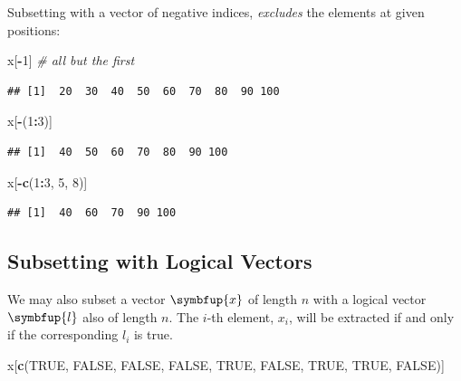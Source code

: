 \documentclass[10pt,b5paper,krantz1]{krantz}
\newenvironment{Shaded}{\begin{snugshade}}{\end{snugshade}}
\newcommand{\CommentTok}[1]{\textcolor[rgb]{0.37,0.37,0.37}{\textit{#1}}}
\newcommand{\DecValTok}[1]{\textcolor[rgb]{0.06,0.06,0.06}{#1}}
\newcommand{\KeywordTok}[1]{\textcolor[rgb]{0.27,0.27,0.27}{\textbf{#1}}}
\newcommand{\NormalTok}[1]{#1}
\newcommand{\OperatorTok}[1]{\textcolor[rgb]{0.43,0.43,0.43}{\textbf{#1}}}
\newcommand{\OtherTok}[1]{\textcolor[rgb]{0.37,0.37,0.37}{#1}}
\renewcommand{\boldsymbol}[1]{\symbfup{#1}}
\begin{document}
Subsetting with a vector of negative indices, \emph{excludes} the elements
at given positions:

\begin{Shaded}
\begin{Highlighting}[]
\NormalTok{x[}\OperatorTok{-}\DecValTok{1}\NormalTok{] }\CommentTok{# all but the first}
\end{Highlighting}
\end{Shaded}

\begin{verbatim}
## [1]  20  30  40  50  60  70  80  90 100
\end{verbatim}

\begin{Shaded}
\begin{Highlighting}[]
\NormalTok{x[}\OperatorTok{-}\NormalTok{(}\DecValTok{1}\OperatorTok{:}\DecValTok{3}\NormalTok{)]}
\end{Highlighting}
\end{Shaded}

\begin{verbatim}
## [1]  40  50  60  70  80  90 100
\end{verbatim}

\begin{Shaded}
\begin{Highlighting}[]
\NormalTok{x[}\OperatorTok{-}\KeywordTok{c}\NormalTok{(}\DecValTok{1}\OperatorTok{:}\DecValTok{3}\NormalTok{, }\DecValTok{5}\NormalTok{, }\DecValTok{8}\NormalTok{)]}
\end{Highlighting}
\end{Shaded}

\begin{verbatim}
## [1]  40  60  70  90 100
\end{verbatim}

\hypertarget{subsetting-with-logical-vectors}{%
\subsection{Subsetting with Logical Vectors}\label{subsetting-with-logical-vectors}}

We may also subset a vector \(\boldsymbol{x}\)
of length \(n\) with a logical vector \(\boldsymbol{l}\) also of length \(n\).
The \(i\)-th element, \(x_i\), will be extracted if and only if the corresponding
\(l_i\) is true.

\begin{Shaded}
\begin{Highlighting}[]
\NormalTok{x[}\KeywordTok{c}\NormalTok{(}\OtherTok{TRUE}\NormalTok{, }\OtherTok{FALSE}\NormalTok{, }\OtherTok{FALSE}\NormalTok{, }\OtherTok{FALSE}\NormalTok{, }\OtherTok{TRUE}\NormalTok{, }\OtherTok{FALSE}\NormalTok{, }\OtherTok{TRUE}\NormalTok{, }\OtherTok{TRUE}\NormalTok{, }\OtherTok{FALSE}\NormalTok{)]}
\end{Highlighting}
\end{Shaded}
\end{document}
